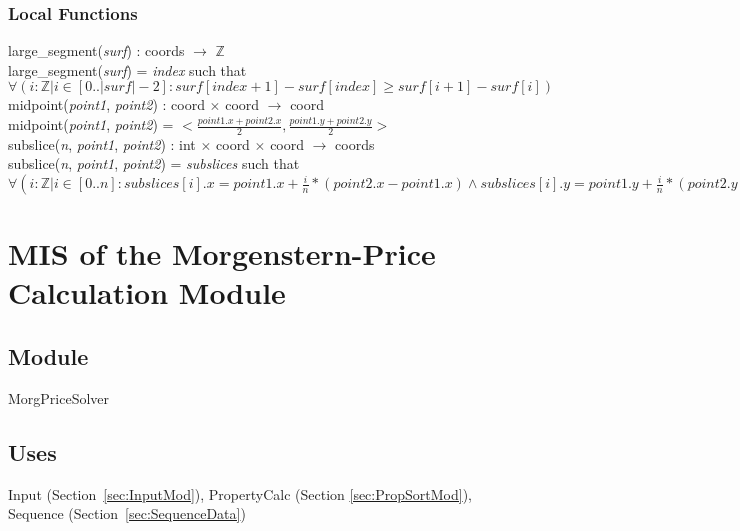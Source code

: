\documentclass[12pt, titlepage]{article}
\begin{document}
\subsubsection{Local Functions}
large\_segment(\textit{surf}) : coords $\rightarrow$ $\mathbb{Z}$\\
large\_segment(\textit{surf}) = \textit{index} such that\\
$\forall(i : \mathbb{Z} | i \in [0..|\textit{surf}|-2] : 
\textit{surf}[\textit{index}+1] - \textit{surf}[\textit{index}] \geq 
\textit{surf}[i+1] - \textit{surf}[i])$\\

\noindent midpoint(\textit{point1}, \textit{point2}) : coord $\times$ coord 
$\rightarrow$ coord\\
midpoint(\textit{point1}, \textit{point2}) = $< \frac{point1.x + point2.x}{2}, 
\frac{point1.y + point2.y}{2} >$\\

\noindent subslice(\textit{n}, \textit{point1}, \textit{point2}) : int $\times$ 
coord $\times$ coord $\rightarrow$ coords\\
subslice(\textit{n}, \textit{point1}, \textit{point2}) = \textit{subslices} 
such that\\
$\forall(i : \mathbb{Z} | i \in [0..n] : subslices[i].x = point1.x + 
\frac{i}{n}*(point2.x - point1.x) \land subslices[i].y = point1.y + 
\frac{i}{n}*(point2.y - point1.y))$\\


\section{MIS of the Morgenstern-Price Calculation Module} \label{sec:MPMod}

\subsection{Module}
MorgPriceSolver

\subsection{Uses}

Input (Section~\ref{sec:InputMod}), PropertyCalc (Section 
\ref{sec:PropSortMod}), Sequence (Section~\ref{sec:SequenceData})
\end{document}
